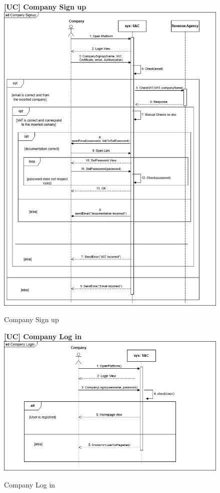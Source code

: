 \begin{figure}[H]
\textbf{[UC\nextUCDiagr] Company Sign up}\newline\newline
\includegraphics[width=15cm]{Images/UC_diagram/RASD-UC3.drawio.png}
    \caption{Company Sign up}
\end{figure}

\begin{figure}[H]
\textbf{[UC\nextUCDiagr] Company Log in}\newline\newline
\includegraphics[width=15cm]{Images/UC_diagram/RASD-UC4.drawio.png}
    \caption{Company Log in}
\end{figure}


